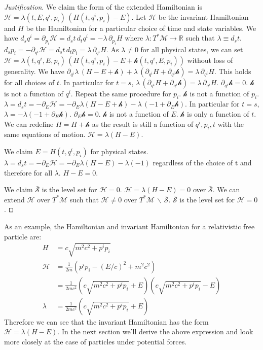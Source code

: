 \documentclass[smallextended]{svjour3}
\numberwithin{equation}{section}
\newenvironment{justification}{\emph{Justification}.}{\hfill\(\qed\)}
\begin{document}
\begin{justification}
	We claim the form of the extended Hamiltonian is $\mathcal{H} = \lambda(t,E,q^i,p_i) \, (H(t,q^i,p_i) - E)$. Let $\mathcal{H}$ be the invariant Hamiltonian and $H$ be the Hamiltonian for a particular choice of time and state variables. We have $d_s q^i = \partial_{p_i} \mathcal{H} = d_s t \, d_t q^i = - \lambda \, \partial_{p_i} H$ where $\lambda : T^*\mathcal{M} \rightarrow \mathbb{R}$ such that $\lambda \equiv d_s t$. $d_s p_i = - \partial_{q^i} \mathcal{H} = d_s t \, d_t p_i = \lambda \, \partial_{q^i} H$. As $\lambda \neq 0$ for all physical states, we can set $\mathcal{H} = \lambda(t,q^i,E,p_i) \, (H(t,q^i,p_i) - E + \mathcal{h}(t,q^i,E,p_i))$ without loss of generality. We have $\partial_{q^i} \lambda \, (H - E + \mathcal{h}) + \lambda \, (\partial_{q^i} H + \partial_{q^i} \mathcal{h}) = \lambda \, \partial_{q^i} H$. This holds for all choices of $t$. In particular for $t=s$, $\lambda \, (\partial_{q^i} H + \partial_{q^i} \mathcal{h}) = \lambda \, \partial_{q^i} H$. $\partial_{q^i} \mathcal{h} = 0$. $\mathcal{h}$ is not a function of $q^i$. Repeat the same procedure for $p_i$. $\mathcal{h}$ is not a function of $p_i$. $\lambda = d_s t = - \partial_E \mathcal{H} = - \partial_{E} \lambda (H - E + \mathcal{h}) - \lambda \, (-1 + \partial_{E} \mathcal{h})$. In particular for $t=s$, $\lambda = - \lambda (-1 + \partial_{E} \mathcal{h})$. $\partial_{E} \mathcal{h} = 0$. $\mathcal{h}$ is not a function of $E$. $\mathcal{h}$ is only a function of $t$. We can redefine $H = H + \mathcal{h}$ as the result is still a function of $q^i, p_i , t$ with the same equations of motion. $\mathcal{H}=\lambda (H - E)$.
	
	We claim $E = H(t,q^i,p_i)$ for physical states. $\lambda = d_s t = - \partial_E \mathcal{H} = - \partial_{E} \lambda (H - E) - \lambda (-1)$ regardless of the choice of t and therefore for all $\lambda$. $H - E = 0$. 
	
	We claim $\bar{\mathcal{S}}$ is the level set for $\mathcal{H} = 0$. $\mathcal{H} = \lambda (H - E) = 0$ over $\bar{\mathcal{S}}$. We can extend $\mathcal{H}$ over $T^* \mathcal{M}$ such that $\mathcal{H} \neq 0$ over $T^*\mathcal{M} \,\backslash\, \bar{\mathcal{S}}$. $\bar{\mathcal{S}}$ is the level set for $\mathcal{H} = 0$.
\end{justification}

As an example, the Hamiltonian and invariant Hamiltonian for a relativistic free particle are:
\begin{equation}\label{free_hamiltonians}
\begin{aligned}
H &= c \sqrt{m^2 c^2 + p^i p_i} \\
\mathcal{H} &= \frac{1}{2m} ( p^i p_i - (E/c)^2 + m^2c^2) \\
 &= \frac{1}{2mc^2} (c \sqrt{m^2 c^2 + p^i p_i} + E) (c \sqrt{m^2 c^2 + p^i p_i} - E) \\
\lambda &= \frac{1}{2mc^2} (c \sqrt{m^2 c^2 + p^i p_i} + E)
\end{aligned}
\end{equation}
Therefore we can see that the invariant Hamiltonian has the form $\mathcal{H}=\lambda (H - E)$. In the next section we'll derive the above expression and look more closely at the case of particles under potential forces.
\end{document}
